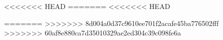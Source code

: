 \documentclass[12pt,twoside]{report}
\begin{document}

\newpage
{}

\newpage
\tableofcontents
\newpage
\listoffigures
\newpage
\pagestyle{fancy}
 \setcounter{page}{1}

\newpage
\pagestyle{fancy}

\newpage
\pagestyle{fancy}

\newpage
\pagestyle{fancy}

<<<<<<< HEAD
%
=======
<<<<<<< HEAD
%
\newpage
\pagestyle{fancy}

\newpage
\pagestyle{fancy}

\newpage
\pagestyle{fancy}

=======
>>>>>>> 8d004a0d37c9610ee701f2acafe45ba776502fff
>>>>>>> 60af8e880ca7d35010329ae2ed304c39c098fe6a
\newpage
\pagestyle{fancy}

\newpage
\newpage
\pagestyle{fancy}

\end{document}
